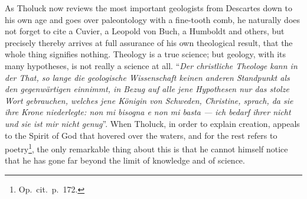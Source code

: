 \documentclass[12pt,a4paper]{article}
\begin{document}
As Tholuck now reviews the most important geologists from Descartes
down to his own age and goes over paleontology with a fine-tooth comb,
he naturally does not forget to cite a Cuvier, a Leopold von Buch, a
Humboldt and others, but precisely thereby arrives at full assurance of
his own theological result, that the whole thing signifies nothing.
Theology is a true science; but geology, with its many hypotheses, is
not really a science at all. ``\textit{Der christliche Theologe kann in
der That, so lange die geologische Wissenschaft keinen anderen
Standpunkt als den gegenwärtigen einnimmt, in Bezug auf alle jene
Hypothesen nur das stolze Wort gebrauchen, welches jene Königin von
Schweden, Christine, sprach, da sie ihre Krone niederlegte: \emph{non
mi bisogna e non mi basta --- ich bedarf ihrer nicht und sie ist mir
nicht genug}}''. When Tholuck, in order to explain creation, appeals to
the Spirit of God that hovered over the waters, and for the rest
refers to poetry\footnote{Op.\ cit.\ p.\ 172.}, %
the only remarkable thing about this is that he cannot himself notice
that he has gone far beyond the limit of knowledge and of science.
\end{document}
